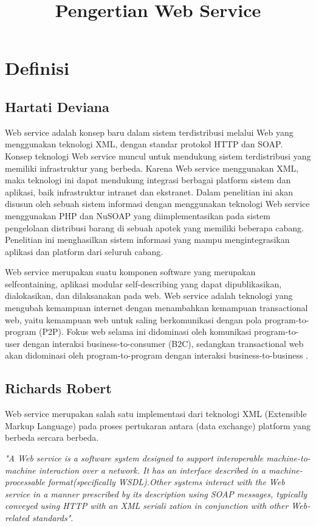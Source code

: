 \documentclass[12pt]{article}
\begin{document}
\title{Pengertian Web Service}
\maketitle

\section{Definisi}

\subsection{Hartati Deviana}
	Web service adalah konsep baru dalam sistem terdistribusi melalui Web yang menggunakan teknologi XML, dengan standar protokol  HTTP dan SOAP. Konsep teknologi Web service muncul untuk mendukung sistem terdistribusi yang memiliki infrastruktur yang berbeda. Karena Web service menggunakan XML, maka teknologi ini dapat mendukung integrasi berbagai platform sistem dan aplikasi, baik infrastruktur intranet dan ekstranet. Dalam penelitian ini akan disusun oleh sebuah sistem informasi dengan menggunakan teknologi Web service menggunakan PHP dan NuSOAP yang diimplementasikan pada sistem pengelolaan distribusi barang di sebuah apotek yang memiliki beberapa cabang. Penelitian ini menghasilkan sistem informasi yang mampu mengintegrasikan aplikasi dan platform dari seluruh cabang.
	
	Web service merupakan suatu komponen software yang merupakan selfcontaining, aplikasi modular self-describing yang dapat dipublikasikan, dialokasikan, dan dilaksanakan pada web. Web service adalah teknologi yang mengubah kemampuan internet dengan menambahkan kemampuan transactional web, yaitu kemampuan web untuk saling berkomunikasi dengan pola program-to-program (P2P). Fokus web selama ini didominasi oleh komunikasi program-to-user dengan interaksi business-to-consumer (B2C), sedangkan transactional web akan didominasi oleh program-to-program dengan interaksi business-to-business \cite{deviana2013penerapan}.

\subsection{Richards Robert}

Web service merupakan salah satu implementasi dari teknologi XML (Extensible Markup Language) pada proses pertukaran antara (data exchange) platform yang berbeda sercara berbeda.

\textit{"A Web service is a software system designed to support interoperable machine-to-machine interaction over a network. It has an interface described in a machine-processable format(specifically WSDL).Other systems interact with the Web service in a manner prescribed by its description using SOAP messages, typically conveyed using HTTP with an XML seriali zation in conjunction with other Web-related standards"}.
\end{document}
